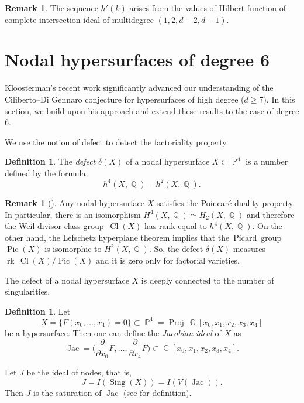 \documentclass[a4paper,11pt,english,german]{amsart}
\DeclareMathOperator{\Cl}{Cl}
\DeclareMathOperator{\Pic}{Pic}
\DeclareMathOperator{\IP}{\mathbb{P}}
\DeclareMathOperator{\Q}{\mathbb{Q}}
\DeclareMathOperator{\C}{\mathbb{C}}
\DeclareMathOperator{\Sing}{Sing}
\DeclareMathOperator{\Jac}{Jac}
\DeclareMathOperator{\Proj}{Proj}
\DeclareMathOperator{\rk}{rk}
\theoremstyle{definition}
\newtheorem{Def}[thm]{Definition}
\newtheorem{remark}[thm]{Remark}
\begin{document}
\begin{remark}
The sequence $h'(k)$ arises from the values of Hilbert function of complete intersection ideal of multidegree $(1,2,d-2,d-1)$.	
\end{remark}



\section{Nodal hypersurfaces of degree 6}\label{5}

Kloosterman's recent work \cite{kloosterman2022maximal} significantly advanced our understanding of the Ciliberto--Di Gennaro conjecture for hypersurfaces of high degree ($d\geqslant 7$). In this section, we build upon his approach and extend these results to the case of degree 6.


We use the notion of defect to detect the factoriality property.

\begin{Def}
	The \emph{defect} $\delta(X)$ of a nodal hypersurface $X\subset \IP^4$ is a number defined by the formula
\begin{equation*}
	h^{4}(X,\Q)-h^{2}(X,\Q).
\end{equation*}
\end{Def}

\begin{remark}[{\cite[Remark 3.5]{kloosterman2022maximal}}]\label{defect_and_factoriality}
Any nodal hypersurface $X$ satisfies the Poincar\'e duality property. In particular, there is an isomorphism $H^{4}(X,\Q)\simeq H_{2}(X,\Q)$ and therefore the Weil divisor class group~$\Cl(X)$ has rank equal to $h^{4}(X,\Q)$. On the other hand, the Lefschetz hyperplane theorem implies that the~Picard~group $\Pic(X)$ is isomorphic to $H^2(X,\Q)$. So, the defect $\delta(X)$ measures $\rk\,\Cl(X)/\Pic(X)$ and it is zero only for factorial varieties.
\end{remark}

The defect of a nodal hypersurface $X$ is deeply connected to the number of singularities.

\begin{Def}
		Let 
		$$X=\{F(x_0,\dots,x_4)=0\}\subset \IP^4=\Proj \,\C[x_0,x_1,x_2,x_3,x_4]$$
		be a hypersurface. Then one can define the \emph{Jacobian ideal} of $X$ as
		$$\Jac=\big(\frac{\partial}{\partial x_0}F,\dots, \frac{\partial}{\partial x_4}F\big)\subset \C[x_0,x_1,x_2,x_3,x_4].$$
\end{Def}
Let $J$ be the ideal of nodes, that is,
$$J=I(\Sing(X))=I(V(\Jac)).$$
Then $J$ is the saturation of $\Jac$ (see \cite[Exercise III-16]{eisenbud2006geometry} for definition). 
\end{document}
